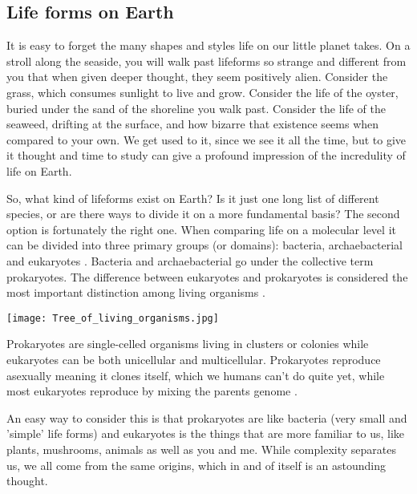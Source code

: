 \subsection*{Life forms on Earth}

It is easy to forget the many shapes and styles life on our little planet takes. On a stroll along the seaside, you will walk past lifeforms so strange and different from you that when given deeper thought, they seem positively alien.
Consider the grass, which consumes sunlight to live and grow. Consider the life of the oyster, buried under the sand of the shoreline you walk past.
Consider the life of the seaweed, drifting at the surface, and how bizarre that existence seems when compared to your own.
We get used to it, since we see it all the time, but to give it thought and time to study can give a profound impression of the incredulity of life on Earth.

So, what kind of lifeforms exist on Earth?
Is it just one long list of different species, or are there ways to divide it on a more fundamental basis?
The second option is fortunately the right one.
When comparing life on a molecular level it can be divided into three primary groups (or domains): bacteria, archaebacterial and eukaryotes \cite{Eukaryotes}.
Bacteria and archaebacterial go under the collective term prokaryotes.
The difference between eukaryotes and prokaryotes is considered the most important distinction among living organisms \cite{Procaryotes}. 

\begin{center}
	\texttt{[image: Tree\_of\_living\_organisms.jpg]}
\end{center}

Prokaryotes are single-celled organisms living in clusters or colonies while eukaryotes can be both unicellular and multicellular.
Prokaryotes reproduce asexually meaning it clones itself, which we humans can't do quite yet, while most eukaryotes reproduce by mixing the parents genome \cite{ProcaEuka}. 

An easy way to consider this is that prokaryotes are like bacteria (very small and 'simple' life forms) and eukaryotes is the things that are more familiar to us, like plants, mushrooms, animals as well as you and me.
While complexity separates us, we all come from the same origins, which in and of itself is an astounding thought.

